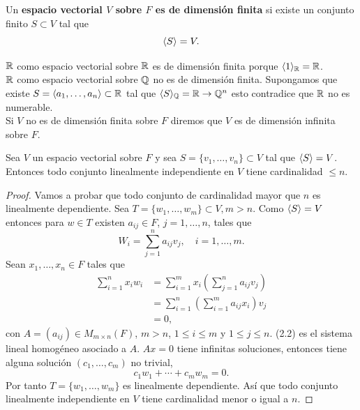 \documentclass[12pt,a4paper]{book}
\newcommand{\parentesis}[1]{\left(#1\right)}
\begin{document}
    \begin{definicion}
    \label{def:15}
        Un \textbf{espacio vectorial $V$ sobre $F$ es de dimensión finita} si existe un conjunto finito
        $S\subset V$ tal que
        \begin{equation*}
            \langle S \rangle=V.
        \end{equation*}
    \end{definicion}

    \begin{ejemplo}
    \label{ej:17}
        $\mathbb{R}$ como espacio vectorial sobre $\mathbb{R}$ es de dimensión finita porque $\langle 1 \rangle_{\mathbb{R}}=\mathbb{R}$.\\
        $\mathbb{R}$ como espacio vectorial sobre $\mathbb{Q}$ no es de dimensión finita. Supongamos que existe
        $S=\langle a_{1},\dots,a_{n} \rangle\subset\mathbb{R}$ tal que $\langle S \rangle_{\mathbb{Q}}=\mathbb{R}\to\mathbb{Q}^{n}$ esto contradice
        que $\mathbb{R}$ no es numerable.\\
        Si $V$ no es de dimensión finita sobre $F$ diremos que $V$ es de dimensión infinita sobre
        $F$.
    \end{ejemplo}

    \begin{teorema}
    \label{teo:5}
        Sea $V$ un espacio vectorial sobre $F$ y sea $S=\{v_{1},\dots,v_{n}\}\subset V$ tal que
        $\langle S \rangle=V$. Entonces todo conjunto linealmente independiente en $V$ tiene cardinalidad
        $\leq n$.
    \end{teorema}
    
    \begin{proof}
        Vamos a probar que todo conjunto de cardinalidad mayor que $n$ es linealmente dependiente.
        Sea $T=\{w_{1},\dots,w_{m}\}\subset V, m\gt n$. Como $\langle S \rangle=V$ entonces para $w\in T$
        existen $a_{ij}\in F$, $j=1,\dots,n$, tales que
        \begin{equation*}
            W_{i}=\sum_{j=1}^{n}a_{ij}v_{j},\quad i=1,\dots,m.
        \end{equation*}
        Sean $x_{1},\dots,x_{n}\in F$ tales que
        \begin{align}
            \sum_{i=1}^{n}x_{i}w_{i}&=\sum_{i=1}^{m}x_{i}\parentesis{\sum_{j=1}^{n}a_{ij}v_{j}}\\
            &=\sum_{i=1}^{n}\parentesis{\sum_{i=1}^{m}a_{ij}x_{i}}v_{j}\\
            &=0,
        \end{align}
        con $A=(a_{ij})\in M_{m\times n}(F)$, $m\gt n$, $1\leq i\leq m$ y $1\leq j\leq n$.
        (2.2) es el sistema lineal homogéneo asociado a $A$. $Ax=0$ tiene infinitas soluciones,
        entonces tiene alguna solución $(c_{1},\dots,c_{m})$ no trivial,
        \begin{equation*}
            c_{1}w_{1}+\cdots+c_{m}w_{m}=0.
        \end{equation*}
        Por tanto $T=\{w_{1},\dots,w_{m}\}$ es linealmente dependiente. Así que todo conjunto
        linealmente independiente en $V$ tiene cardinalidad menor o igual a $n$.
    \end{proof}
\end{document}
